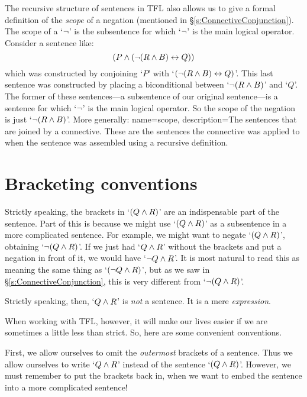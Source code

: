 The recursive structure of sentences in TFL also allows us to give a formal definition of the \emph{scope} of a negation (mentioned in \S\ref{s:ConnectiveConjunction}). The scope of a `$\neg$' is the subsentence for which `$\neg$' is the main logical operator. Consider a sentence like:
$$(P \wedge (\neg (R \wedge B) \leftrightarrow Q))$$
which was constructed by conjoining `$P$' with `$ (\neg (R \wedge B) \leftrightarrow Q)$'. This last sentence was constructed by placing a biconditional between `$\neg (R \wedge B)$' and `$Q$'. The former of these sentences---a subsentence of our original sentence---is a sentence for which `$\neg$' is the main logical operator. So the scope of the negation is just `$\neg(R \wedge B)$'. More generally:
{
name=scope,
description={The sentences that are joined by a connective. These are the sentences the connective was applied to when the sentence was assembled using a recursive definition.}
}



\section{Bracketing conventions}
\label{TFLconventions}
Strictly speaking, the brackets in `$(Q \wedge R)$' are an indispensable part of the sentence. Part of this is because we might use `$(Q \wedge R)$' as a subsentence in a more complicated sentence. For example, we might want to negate `$(Q \wedge R)$', obtaining `$\neg(Q \wedge R)$'. If we just had `$Q \wedge R$' without the brackets and put a negation in front of it, we would have `$\neg Q \wedge R$'. It is most natural to read this as meaning the same thing as `$(\neg Q \wedge R)$', but as we saw in  \S\ref{s:ConnectiveConjunction}, this is very different from `$\neg(Q\wedge R)$'.

Strictly speaking, then, `$Q \wedge R$' is \emph{not} a sentence. It is a mere \emph{expression}.

When working with TFL, however, it will make our lives easier if we are sometimes a little less than strict. So, here are some convenient conventions.

First,  we allow ourselves to omit the \emph{outermost} brackets of a sentence. Thus we allow ourselves to write `$Q \wedge R$' instead of the sentence `$(Q \wedge R)$'. However, we must remember to put the brackets back in, when we want to embed the sentence into a more complicated sentence!

